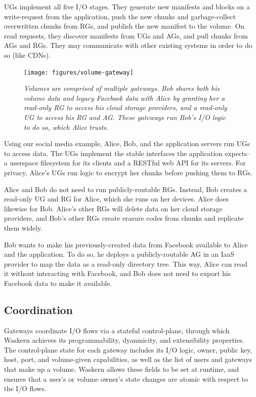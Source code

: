 UGs implement all five I/O stages. They generate new manifests and blocks on a
write-request from the application, push the new chunks and garbage-collect
overwritten chunks from RGs, and publish the new manifest to the volume. On read
requests, they discover manifests from UGs and AGs, and pull chunks from AGs and
RGs. They may communicate with other existing systems in order to do so (like
CDNs).

\begin{figure}
\centering
\texttt{[image: figures/volume-gateway]}
\caption{\it Volumes are comprised of multiple gateways.  Bob shares both his
volume data and legacy Facebook data with Alice by granting her a read-only RG
to access his cloud storage providers, and a read-only UG to access his RG and
AG.  These gateways run Bob's I/O logic to do so, which Alice trusts.}
\label{fig:volume-gateway}
\end{figure}

Using our social media example, Alice, Bob, and the application servers run UGs
to access data. The UGs implement the stable interfaces the application
expects--a userspace filesystem for its clients and a RESTful web API for its
servers. For privacy, Alice's UGs run logic to encrypt her chunks before
pushing them to RGs.

Alice and Bob do not need to run publicly-routable RGs. Instead, Bob creates
a read-only UG and RG for Alice, which she runs on her devices. Alice does
likewise for Bob.  Alice's other RGs will delete data on her cloud storage
providers, and Bob's other RGs create erasure codes from chunks and
replicate them widely.

Bob wants to make his previously-created data from Facebook available to Alice
and the application.  To do so, he deploys a publicly-routable AG in an IaaS
provider to map the data as a read-only directory tree. This way, Alice can
read it without interacting with Facebook, and Bob does not need to export his
Facebook data to make it available.

\subsection{Coordination}

Gateways coordinate I/O flows via a stateful control-plane, through which
Waskern achieves its programmability, dyanmicity, and extensibility
properties. The control-plane state for each gateway includes its I/O logic,
owner, public key, host, port, and volume-given capabilities, as well as the
list of users and gateways that make up a volume. Waskern allows these fields
to be set at runtime, and ensures that a user's or volume owner's state
changes are atomic with respect to the I/O flows.

